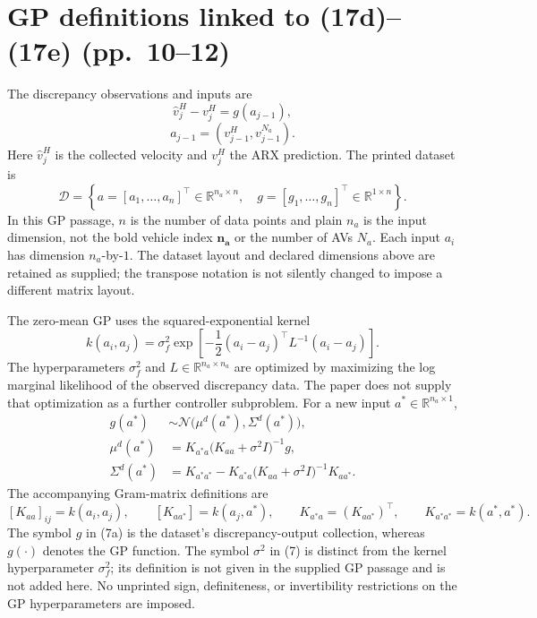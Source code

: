 \documentclass{article}
\begin{document}
\section*{GP definitions linked to (17d)--(17e) (pp.\ 10--12)}
The discrepancy observations and inputs are
\begin{equation}
\widehat v_j^H-v_j^H=g(a_{j-1}),\tag{4}
\end{equation}
\[
a_{j-1}=(v_{j-1}^H,v_{j-1}^{N_a}).
\]
Here $\widehat v_j^H$ is the collected velocity and $v_j^H$ the ARX prediction. The printed dataset is
\[
\mathcal D=\left\{
 a=[a_1,\ldots,a_n]^\top\in\mathbb R^{n_a\times n},\quad
 g=[g_1,\ldots,g_n]^\top\in\mathbb R^{1\times n}
\right\}.
\]
In this GP passage, $n$ is the number of data points and plain $n_a$ is the input dimension, not the bold vehicle index $\mathbf{n_a}$ or the number of AVs $N_a$. Each input $a_i$ has dimension $n_a$-by-$1$. The dataset layout and declared dimensions above are retained as supplied; the transpose notation is not silently changed to impose a different matrix layout.

The zero-mean GP uses the squared-exponential kernel
\begin{equation}
k(a_i,a_j)=\sigma_f^2\exp\left[-\frac12(a_i-a_j)^\top L^{-1}(a_i-a_j)\right].\tag{5}
\end{equation}
The hyperparameters $\sigma_f^2$ and $L\in\mathbb R^{n_a\times n_a}$ are optimized by maximizing the log marginal likelihood of the observed discrepancy data. The paper does not supply that optimization as a further controller subproblem. For a new input $a^*\in\mathbb R^{n_a\times1}$,
\begin{align}
g(a^*)&\sim\mathcal N\bigl(\mu^d(a^*),\Sigma^d(a^*)\bigr),\tag{6}\\
\mu^d(a^*)&=K_{a^*a}\bigl(K_{aa}+\sigma^2I\bigr)^{-1}g,\tag{7a}\\
\Sigma^d(a^*)&=K_{a^*a^*}
 -K_{a^*a}\bigl(K_{aa}+\sigma^2I\bigr)^{-1}K_{aa^*}.\tag{7b}
\end{align}
The accompanying Gram-matrix definitions are
\[
[K_{aa}]_{ij}=k(a_i,a_j),\qquad
[K_{aa^*}]=k(a_j,a^*),\qquad
K_{a^*a}=(K_{aa^*})^\top,\qquad
K_{a^*a^*}=k(a^*,a^*).
\]
The symbol $g$ in (7a) is the dataset's discrepancy-output collection, whereas $g(\cdot)$ denotes the GP function. The symbol $\sigma^2$ in (7) is distinct from the kernel hyperparameter $\sigma_f^2$; its definition is not given in the supplied GP passage and is not added here. No unprinted sign, definiteness, or invertibility restrictions on the GP hyperparameters are imposed.
\end{document}
